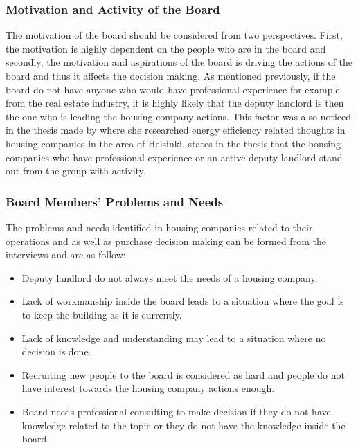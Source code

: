 \subsubsection*{Motivation and Activity of the Board}

The motivation of the board should be considered from two perspectives. First, the motivation is highly dependent on the people who are in the board and secondly, the motivation and aspirations of the board is driving the actions of the board and thus it affects the decision making. As mentioned previously, if the board do not have anyone who would have professional experience for example from the real estate industry, it is highly likely that the deputy landlord is then the one who is leading the housing company actions. This factor was also noticed in the thesis made by \textcite{PehkonenThesis:2012} where she researched energy efficiency related thoughts in housing companies in the area of Helsinki. \textcite{PehkonenThesis:2012} states in the thesis that the housing companies who have professional experience or an active deputy landlord stand out from the group with activity.

\subsubsection*{Board Members' Problems and Needs}

The problems and needs identified in housing companies related to their operations and as well as purchase decision making can be formed from the interviews and are as follow:
\begin{itemize}
	\setlength{\itemsep}{1pt}
	\item Deputy landlord do not always meet the needs of a housing company.
	\item Lack of workmanship inside the board leads to a situation where the goal is to keep the building as it is currently.
	\item Lack of knowledge and understanding may lead to a situation where no decision is done.
	\item Recruiting new people to the board is considered as hard and people do not have interest towards the housing company actions enough.
	\item Board needs professional consulting to make decision if they do not have knowledge related to the topic or they do not have the knowledge inside the board.
\end{itemize}

